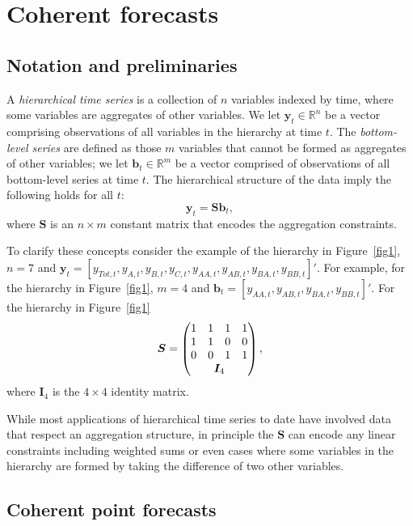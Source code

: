 \documentclass[12pt]{article}
\theoremstyle{definition}
\begin{document}
\section{Coherent forecasts}\label{sec:definitions}

\subsection{Notation and preliminaries}\label{sec:notation}

A \emph{hierarchical time series} is a collection of $n$ variables indexed by time, where some variables are aggregates of other variables. We let $\bm{y}_t \in \mathbb{R}^n$ be a vector comprising observations of all variables in the hierarchy at time $t$. The \emph{bottom-level series} are defined as those $m$ variables that cannot be formed as aggregates of other variables; we let $\bm{b}_t \in \mathbb{R}^m$ be a vector comprised of observations of all bottom-level series at time $t$.  The hierarchical structure of the data imply the following holds for all $t$:
\begin{equation}
\bm{y}_t = \bm{Sb}_t,
\end{equation}
where $\bm{S}$ is an $n \times m$ constant matrix that encodes the aggregation constraints.  

To clarify these concepts consider the example of the hierarchy in Figure~\ref{fig1}, $n=7$ and $\bm{y}_t = [y_{Tot,t},y_{A,t}, y_{B,t},y_{C,t},y_{AA,t}, y_{AB,t}, y_{BA,t}, y_{BB,t}]'$.  For example, for the hierarchy in Figure~\ref{fig1}, $m=4$ and $\bm{b}_t = [y_{AA,t}, y_{AB,t}, y_{BA,t}, y_{BB,t}]'$.  For the hierarchy in Figure~\ref{fig1}
\[
  \bm{S} = \begin{pmatrix}
               1 & 1 & 1 & 1  \\
               1 & 1 & 0 & 0 \\
               0 & 0 & 1 & 1 \\
               & \multicolumn{2}{c}{\bm{I}_4} &
           \end{pmatrix},
\]
where $\bm{I}_4$ is the $4\times 4$ identity matrix.

While most applications of hierarchical time series to date have involved data that respect an aggregation structure, in principle the ${\bm S}$ can encode any linear constraints including weighted sums or even cases where some variables in the hierarchy are formed by taking the difference of two other variables.

\subsection{Coherent point forecasts}\label{sec:cohpointf}
\end{document}
